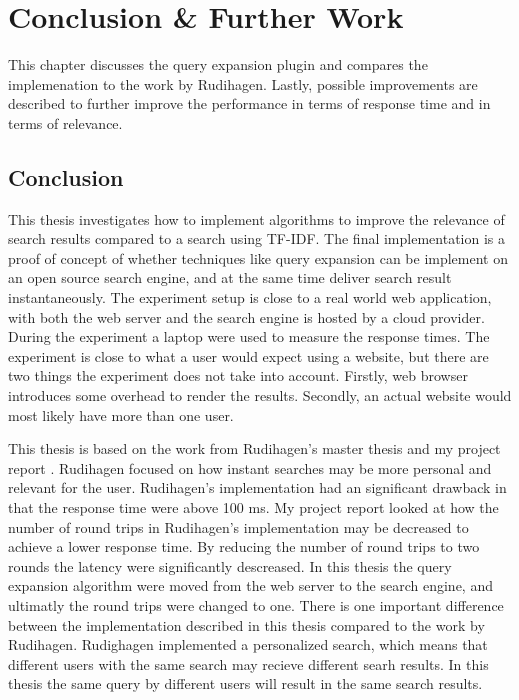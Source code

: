 \chapter{Conclusion \& Further Work}
\label{ch:conclusion}
This chapter discusses the query expansion plugin and compares the implemenation to the work by Rudihagen.
Lastly,
possible improvements are described to further improve the performance in terms of response time and in terms of relevance.

\section{Conclusion}
This thesis investigates how to implement algorithms to improve the relevance of search results compared to a search using TF-IDF.
The final implementation is a proof of concept of whether techniques like query expansion can be implement on an open source search engine,
and at the same time deliver search result instantaneously.
The experiment setup is close to a real world web application,
with both the web server and the search engine is hosted by a cloud provider.
During the experiment a laptop were used to measure the response times.
The experiment is close to what a user would expect using a website,
but there are two things the experiment does not take into account.
Firstly, web browser introduces some overhead to render the results.
Secondly, an actual website would most likely have more than one user.

This thesis is based on the work from Rudihagen's master thesis \cite{master-thesis} and my project report \cite{project-report}.
Rudihagen focused on how instant searches may be more personal and relevant for the user.
Rudihagen's implementation had an significant drawback in that the response time were above 100 ms.
My project report looked at how the number of round trips in Rudihagen's implementation may be decreased to achieve a lower response time.
By reducing the number of round trips to two rounds the latency were significantly descreased.
In this thesis the query expansion algorithm were moved from the web server to the search engine,
and ultimatly the round trips were changed to one.
There is one important difference between the implementation described in this thesis compared to the work by Rudihagen.
Rudighagen implemented a personalized search, which means that different users with the same search may recieve different searh results.
In this thesis the same query by different users will result in the same search results.


